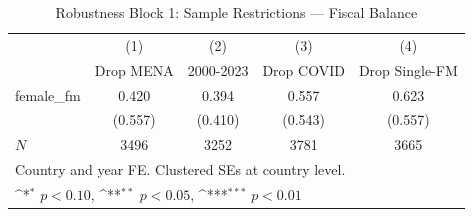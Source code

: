 \begin{table}[htbp]\centering
\def\sym#1{\ifmmode^{#1}\else\(^{#1}\)\fi}
\caption{Robustness Block 1: Sample Restrictions — Fiscal Balance}
\begin{tabular}{l*{4}{c}}
\hline\hline
            &\multicolumn{1}{c}{(1)}&\multicolumn{1}{c}{(2)}&\multicolumn{1}{c}{(3)}&\multicolumn{1}{c}{(4)}\\
            &\multicolumn{1}{c}{Drop MENA}&\multicolumn{1}{c}{2000-2023}&\multicolumn{1}{c}{Drop COVID}&\multicolumn{1}{c}{Drop Single-FM}\\
\hline
female\_fm   &       0.420         &       0.394         &       0.557         &       0.623         \\
            &     (0.557)         &     (0.410)         &     (0.543)         &     (0.557)         \\
\hline
\(N\)       &        3496         &        3252         &        3781         &        3665         \\
\hline\hline
\multicolumn{5}{l}{\footnotesize Country and year FE. Clustered SEs at country level.}\\
\multicolumn{5}{l}{\footnotesize \sym{*} \(p<0.10\), \sym{**} \(p<0.05\), \sym{***} \(p<0.01\)}\\
\end{tabular}
\end{table}
